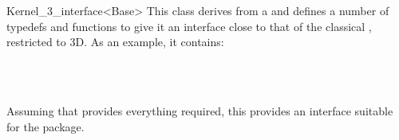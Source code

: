 \begin{ccRefClass}{Kernel_3_interface<Base>}
\ccDefinition
This class derives from a   and defines a number
of typedefs and functions to give it an interface close to that of the
classical , restricted to 3D. As an example, it contains:

\\
\\

Assuming that  provides everything required, this provides
an interface suitable for the  package.

\end{ccRefClass}
